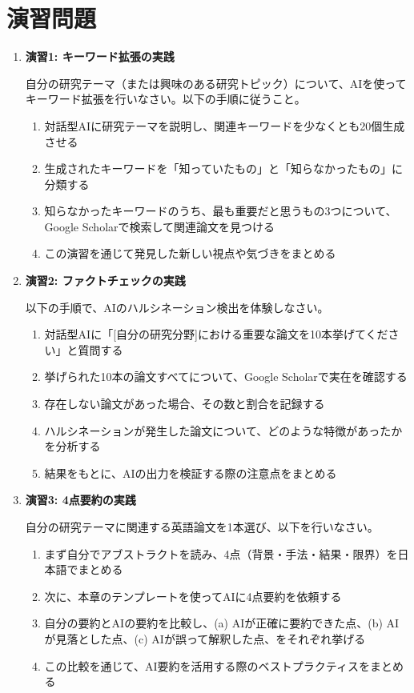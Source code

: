 \section*{演習問題}

\begin{enumerate}
\item \textbf{演習1: キーワード拡張の実践}

自分の研究テーマ（または興味のある研究トピック）について、AIを使ってキーワード拡張を行いなさい。以下の手順に従うこと。

\begin{enumerate}
\item 対話型AIに研究テーマを説明し、関連キーワードを少なくとも20個生成させる
\item 生成されたキーワードを「知っていたもの」と「知らなかったもの」に分類する
\item 知らなかったキーワードのうち、最も重要だと思うもの3つについて、Google Scholarで検索して関連論文を見つける
\item この演習を通じて発見した新しい視点や気づきをまとめる
\end{enumerate}

\item \textbf{演習2: ファクトチェックの実践}

以下の手順で、AIのハルシネーション検出を体験しなさい。

\begin{enumerate}
\item 対話型AIに「[自分の研究分野]における重要な論文を10本挙げてください」と質問する
\item 挙げられた10本の論文すべてについて、Google Scholarで実在を確認する
\item 存在しない論文があった場合、その数と割合を記録する
\item ハルシネーションが発生した論文について、どのような特徴があったかを分析する
\item 結果をもとに、AIの出力を検証する際の注意点をまとめる
\end{enumerate}

\item \textbf{演習3: 4点要約の実践}

自分の研究テーマに関連する英語論文を1本選び、以下を行いなさい。

\begin{enumerate}
\item まず自分でアブストラクトを読み、4点（背景・手法・結果・限界）を日本語でまとめる
\item 次に、本章のテンプレートを使ってAIに4点要約を依頼する
\item 自分の要約とAIの要約を比較し、(a) AIが正確に要約できた点、(b) AIが見落とした点、(c) AIが誤って解釈した点、をそれぞれ挙げる
\item この比較を通じて、AI要約を活用する際のベストプラクティスをまとめる
\end{enumerate}


\end{enumerate}
